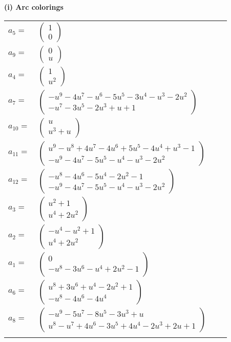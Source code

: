 \documentclass[1p]{elsarticle_modified}
\theoremstyle{definition}
\begin{document}
\flushleft \textbf{(i) Arc colorings}\\
\begin{tabular}{m{7pt} m{180pt} m{7pt} m{180pt} }
\flushright $a_{5}=$&$\begin{pmatrix}1\\0\end{pmatrix}$ \\
\flushright $a_{9}=$&$\begin{pmatrix}0\\u\end{pmatrix}$ \\
\flushright $a_{4}=$&$\begin{pmatrix}1\\u^2\end{pmatrix}$ \\
\flushright $a_{7}=$&$\begin{pmatrix}- u^9-4 u^7- u^6-5 u^5-3 u^4- u^3-2 u^2\\- u^7-3 u^5-2 u^3+u+1\end{pmatrix}$ \\
\flushright $a_{10}=$&$\begin{pmatrix}u\\u^3+u\end{pmatrix}$ \\
\flushright $a_{11}=$&$\begin{pmatrix}u^9- u^8+4 u^7-4 u^6+5 u^5-4 u^4+u^3-1\\- u^9-4 u^7-5 u^5- u^4- u^3-2 u^2\end{pmatrix}$ \\
\flushright $a_{12}=$&$\begin{pmatrix}- u^8-4 u^6-5 u^4-2 u^2-1\\- u^9-4 u^7-5 u^5- u^4- u^3-2 u^2\end{pmatrix}$ \\
\flushright $a_{3}=$&$\begin{pmatrix}u^2+1\\u^4+2 u^2\end{pmatrix}$ \\
\flushright $a_{2}=$&$\begin{pmatrix}- u^4- u^2+1\\u^4+2 u^2\end{pmatrix}$ \\
\flushright $a_{1}=$&$\begin{pmatrix}0\\- u^8-3 u^6- u^4+2 u^2-1\end{pmatrix}$ \\
\flushright $a_{6}=$&$\begin{pmatrix}u^8+3 u^6+u^4-2 u^2+1\\- u^8-4 u^6-4 u^4\end{pmatrix}$ \\
\flushright $a_{8}=$&$\begin{pmatrix}- u^9-5 u^7-8 u^5-3 u^3+u\\u^8- u^7+4 u^6-3 u^5+4 u^4-2 u^3+2 u+1\end{pmatrix}$\\&\end{tabular}
\end{document}
